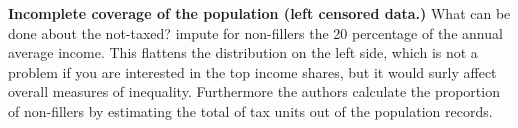 \documentclass[twoside]{article}\usepackage[]{graphicx}\usepackage[]{color}
\begin{document}
\begin{multicols}{2}












\textbf{Incomplete coverage of the population (left censored data.)} What can be done about the not-taxed? \citet{dell_income_2007} impute for non-fillers the 20 percentage of the annual average income. This flattens the distribution on the left side, which is not a problem if you are interested in the top income shares, but it would surly affect overall measures of inequality. Furthermore the authors calculate the proportion of non-fillers by estimating the total of tax units out of the population records. \\


\end{multicols}
\end{document}

